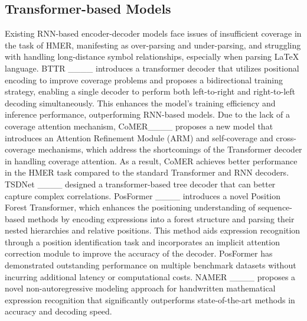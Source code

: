 \subsection{Transformer-based Models}
Existing RNN-based encoder-decoder models face issues of insufficient coverage in the task of HMER, manifesting as over-parsing and under-parsing, and struggling with handling long-distance symbol relationships, especially when parsing LaTeX language. BTTR ____ introduces a transformer decoder that utilizes positional encoding to improve coverage problems and proposes a bidirectional training strategy, enabling a single decoder to perform both left-to-right and right-to-left decoding simultaneously. This enhances the model’s training efficiency and inference performance, outperforming RNN-based models. Due to the lack of a coverage attention mechanism, CoMER____ proposes a new model that introduces an Attention Refinement Module (ARM) and self-coverage and cross-coverage mechanisms, which address the shortcomings of the Transformer decoder in handling coverage attention. As a result, CoMER achieves better performance in the HMER task compared to the standard Transformer and RNN decoders. TSDNet ____ designed a transformer-based tree decoder that can better capture complex correlations. PosFormer ____ introduces a novel Position Forest Transformer, which enhances the positioning understanding of sequence-based methods by encoding expressions into a forest structure and parsing their nested hierarchies and relative positions. This method aids expression recognition through a position identification task and incorporates an implicit attention correction module to improve the accuracy of the decoder. PosFormer has demonstrated outstanding performance on multiple benchmark datasets without incurring additional latency or computational costs. NAMER ____ proposes a novel non-autoregressive modeling approach for handwritten mathematical expression recognition that significantly outperforms state-of-the-art methods in accuracy and decoding speed.